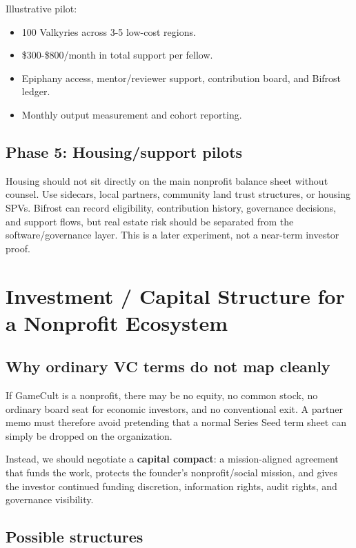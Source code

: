 \documentclass[11pt,oneside]{report}
\newcommand{\term}[1]{\textbf{#1}}
\begin{document}
Illustrative pilot:

\begin{itemize}
  \item 100 Valkyries across 3-5 low-cost regions.
  \item \$300-\$800/month in total support per fellow.
  \item Epiphany access, mentor/reviewer support, contribution board, and Bifrost ledger.
  \item Monthly output measurement and cohort reporting.
\end{itemize}

\section{Phase 5: Housing/support pilots}

Housing should not sit directly on the main nonprofit balance sheet without counsel. Use sidecars, local partners, community land trust structures, or housing SPVs. Bifrost can record eligibility, contribution history, governance decisions, and support flows, but real estate risk should be separated from the software/governance layer. This is a later experiment, not a near-term investor proof.

\chapter{Investment / Capital Structure for a Nonprofit Ecosystem}

\section{Why ordinary VC terms do not map cleanly}

If GameCult is a nonprofit, there may be no equity, no common stock, no ordinary board seat for economic investors, and no conventional exit. A partner memo must therefore avoid pretending that a normal Series Seed term sheet can simply be dropped on the organization.

Instead, we should negotiate a \term{capital compact}: a mission-aligned agreement that funds the work, protects the founder's nonprofit/social mission, and gives the investor continued funding discretion, information rights, audit rights, and governance visibility.

\section{Possible structures}
\end{document}
